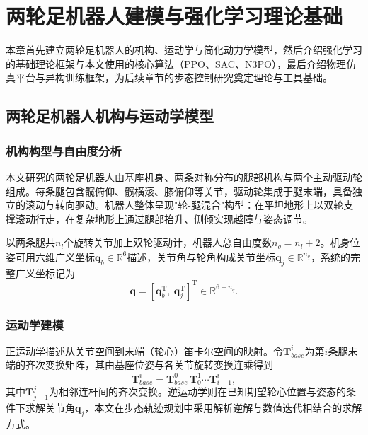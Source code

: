 
\chapter[两轮足机器人建模与强化学习理论基础]{两轮足机器人建模与强化学习理论基础}
\label{cha:theory}

本章首先建立两轮足机器人的机构、运动学与简化动力学模型，然后介绍强化学习的基础理论框架与本文使用的核心算法（PPO、SAC、N3PO），最后介绍物理仿真平台与异构训练框架，为后续章节的步态控制研究奠定理论与工具基础。

\section{两轮足机器人机构与运动学模型}

\subsection{机构构型与自由度分析}

本文研究的两轮足机器人由基座机身、两条对称分布的腿部机构与两个主动驱动轮组成。每条腿包含髋俯仰、髋横滚、膝俯仰等关节，驱动轮集成于腿末端，具备独立的滚动与转向驱动。机器人整体呈现"轮-腿混合"构型：在平坦地形上以双轮支撑滚动行走，在复杂地形上通过腿部抬升、侧倾实现越障与姿态调节。

以两条腿共$n_l$个旋转关节加上双轮驱动计，机器人总自由度数$n_q = n_l + 2$。机身位姿可用六维广义坐标$\boldsymbol{q}_b \in \mathbb{R}^6$描述，关节角与轮角构成关节坐标$\boldsymbol{q}_j \in \mathbb{R}^{n_q}$，系统的完整广义坐标记为
\begin{equation}
  \boldsymbol{q} = \left[\boldsymbol{q}_b^{\mathrm{T}},\ \boldsymbol{q}_j^{\mathrm{T}}\right]^{\mathrm{T}} \in \mathbb{R}^{6+n_q}.
  \label{eq:qcoord}
\end{equation}

\subsection{运动学建模}

正运动学描述从关节空间到末端（轮心）笛卡尔空间的映射。令$\boldsymbol{T}_{base}^{i}$为第$i$条腿末端的齐次变换矩阵，其由基座位姿与各关节旋转变换连乘得到
\begin{equation}
  \boldsymbol{T}_{base}^{i} = \boldsymbol{T}_{base}^{0}\,\boldsymbol{T}_{0}^{1}\cdots \boldsymbol{T}_{i-1}^{i},
  \label{eq:fk}
\end{equation}
其中$\boldsymbol{T}_{j-1}^{j}$为相邻连杆间的齐次变换。逆运动学则在已知期望轮心位置与姿态的条件下求解关节角$\boldsymbol{q}_j$，本文在步态轨迹规划中采用解析逆解与数值迭代相结合的求解方式。

